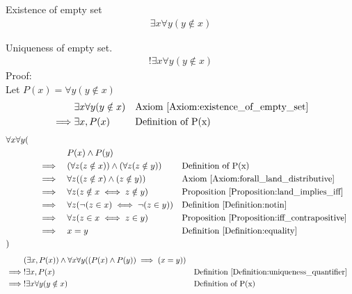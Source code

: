 \begin{axm}
\label{Axiom:existence_of_empty_set}
Existence of empty set
\begin{align*}
\exists x \forall y (y \notin x)
\end{align*}
\end{axm}

\begin{prop}
\label{Proposition:uniqueness_of_empty_set}
Uniqueness of empty set.
\begin{align*}
!\exists x \forall y (y \notin x)
\end{align*}
Proof: \\
Let $P(x) = \forall y (y \notin x)$
\begin{align*}
& \exists x \forall y (y \notin x) && \text{Axiom \ref{Axiom:existence_of_empty_set}} \\
\implies & \exists x, P(x) && \text{Definition of P(x)}
\end{align*}
\begin{align*}
& \forall x \forall y ( \\
& \quad && &&  P(x) \land P(y) \\
& \quad && \implies &&  (\forall z (z \notin x)) \land (\forall z (z \notin y))
&& \text{Definition of P(x)} \\
& \quad && \implies && \forall z ((z \notin x) \land (z \notin y))
&& \text{Axiom \ref{Axiom:forall_land_distributive}} \\
& \quad && \implies && \forall z (z \notin x \iff z \notin y)
&& \text{Proposition \ref{Proposition:land_implies_iff}} \\
& \quad && \implies && \forall z (\lnot(z \in x) \iff \lnot (z \in y))
&& \text{Definition \ref{Definition:notin}} \\
& \quad && \implies && \forall z (z \in x \iff z \in y)
&& \text{Proposition \ref{Proposition:iff_contrapositive}} \\
& \quad && \implies && x = y
&& \text{Definition \ref{Definition:equality}} \\
& )
\end{align*}
\begin{align*}
& (\exists x, P(x)) \land \forall x \forall y ( (P(x) \land P(y)) \implies (x=y) ) \\
\implies & !\exists x, P(x) && \text{Definition \ref{Definition:uniqueness_quantifier}} \\
\implies & !\exists x \forall y (y \notin x) && \text{Definition of P(x)} \\
\end{align*}
\end{prop}

